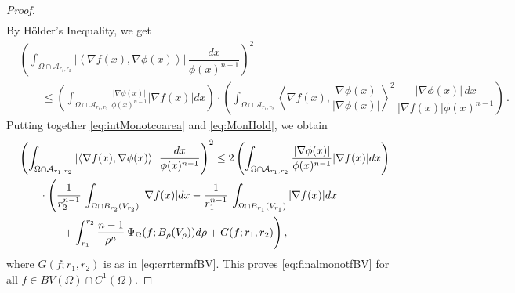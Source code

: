 \documentclass[a4paper,reqno,11pt]{amsart}
\newcommand{\cA}{\mathcal{A}}
\begin{document}
\begin{proof}
\begin{align}
		\end{align}
		By H\"older's Inequality, we get
		\begin{align} \label{eq:MonHold}
			&\left( \int_{\Omega \cap \cA_{r_{1},r_{2}}} \left| \left\langle \nabla f (x) , \nabla \phi (x) \right\rangle \right| \, \dfrac{dx}{\phi(x)^{n-1}} \right)^{2} \\ 
			& \qquad \leq \left( \int_{\Omega \cap \cA_{r_{1},r_{2}}} \frac{|\nabla \phi(x)|}{\phi(x)^{n-1}} |\nabla f (x)| dx \right) \cdot \left( \int_{\Omega \cap \cA_{r_{1},r_{2}}} \left\langle \nabla f (x) , \dfrac{\nabla \phi (x)}{|\nabla \phi (x)|} \right\rangle^{2} \, \dfrac{|\nabla \phi(x)|\,dx}{|\nabla f (x)| \phi(x)^{n-1}} \right) \, . \nonumber
		\end{align}
		Putting together \eqref{eq:intMonotcoarea} and \eqref{eq:MonHold}, we obtain 
		\begin{align} \label{eq:finalmonotf}
			& \left( \int_{\Omega \cap \cA_{r_{1},r_{2}}} \left| \left\langle \nabla f (x) , \nabla \phi (x) \right\rangle \right| \, \dfrac{dx}{\phi(x)^{n-1}} \right)^{2} \leq 2\left( \int_{\Omega \cap \cA_{r_{1},r_{2}}} \frac{|\nabla \phi(x)|}{\phi(x)^{n-1}} |\nabla f (x)| dx \right) \nonumber \\
			& \qquad \cdot \Bigg{(} \dfrac{1}{r_{2}^{n-1}} \, \int_{\Omega \cap B_{r_{2}}(V_{r_2})} |\nabla f (x)| dx - \dfrac{1}{r_{1}^{n-1}} \, \int_{\Omega \cap B_{r_{1}}(V_{r_1})} |\nabla f (x)| dx \\
			& \qquad \qquad+ \int_{r_{1}}^{r_{2}} \dfrac{n-1}{\rho^{n}} \, \Psi_{\Omega}(f;B_{\rho}(V_{\rho})) d\rho + G(f;r_1,r_{2}) \Bigg{)} \nonumber \, ,
		\end{align}
		where $G(f;r_1,r_2)$ is as in \eqref{eq:errtermfBV}. This proves \eqref{eq:finalmonotfBV} for all $f \in BV(\Omega) \cap C^1(\Omega)$. 
		

\end{proof}
\end{document}
